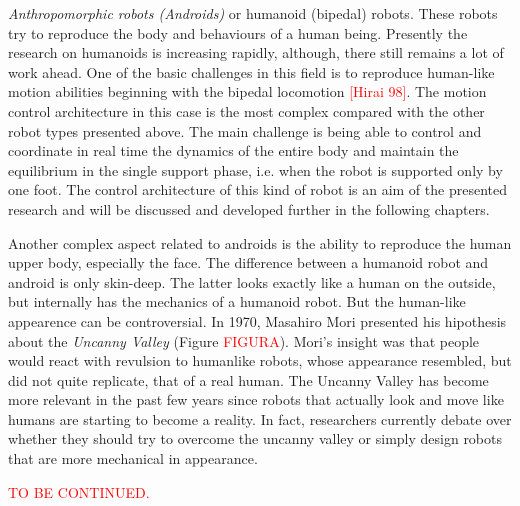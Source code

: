 \textit{Anthropomorphic robots (Androids)} or humanoid (bipedal) robots. These robots try to reproduce the body and behaviours of a human being. Presently the research on humanoids is increasing rapidly, although, there still remains a lot of work ahead. One of the basic challenges in this field is to reproduce human-like motion abilities beginning with the bipedal locomotion \textcolor{red}{[Hirai 98]}. The motion control architecture in this case is the most complex compared with the other robot types presented above. The main challenge is being able to control and coordinate in real time the dynamics of the entire body and maintain the equilibrium in the single support phase, i.e. when the robot is supported only by one foot. The control architecture of this kind of robot is an aim of the presented research and will be discussed and developed further in the following chapters.

Another complex aspect related to androids is the ability to reproduce the human upper body, especially the face. The difference between a humanoid robot and android is only skin-deep. The latter looks exactly like a human on the outside, but internally has the mechanics of a humanoid robot. But the human-like appearence can be controversial. In 1970, Masahiro Mori presented his hipothesis about the \textit{Uncanny Valley} (Figure \textcolor{red}{FIGURA}). Mori's insight was that people would react with revulsion to humanlike robots, whose appearance resembled, but did not quite replicate, that of a real human. The Uncanny Valley has become more relevant in the past few years since robots that actually look and move like humans are starting to become a reality. In fact, researchers currently debate over whether they should try to overcome the uncanny valley or simply design robots that are more mechanical in appearance.

\textcolor{red}{TO BE CONTINUED.}